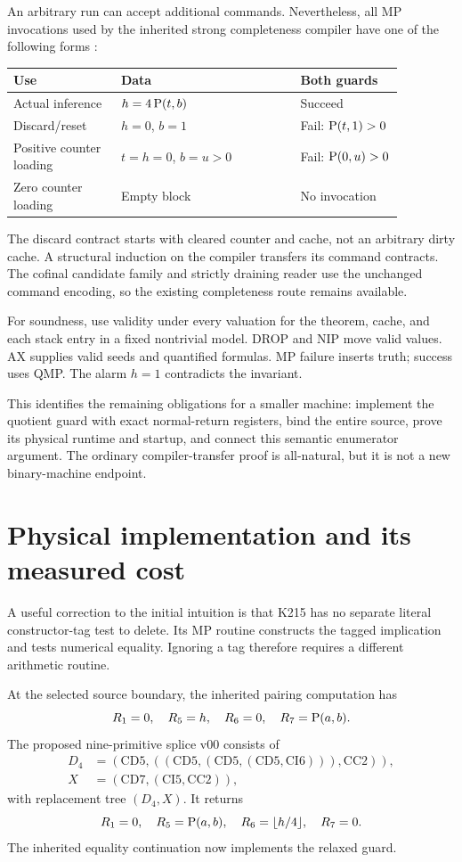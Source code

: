 \documentclass[11pt]{article}
\begin{document}
An arbitrary run can accept additional commands. Nevertheless, all MP invocations used by the inherited strong completeness compiler have one of the following forms \cite{enumperm}:
\begin{center}\begin{tabular}{p{0.24\linewidth}p{0.40\linewidth}p{0.23\linewidth}}\toprule
Use & Data & Both guards \\\midrule
Actual inference & $h=4\operatorname{P}(t,b)$ & Succeed \\
Discard/reset & $h=0$, $b=1$ & Fail: $\operatorname{P}(t,1)>0$ \\
Positive counter loading & $t=h=0$, $b=u>0$ & Fail: $\operatorname{P}(0,u)>0$ \\
Zero counter loading & Empty block & No invocation \\\bottomrule
\end{tabular}\end{center}
The discard contract starts with cleared counter and cache, not an arbitrary dirty cache. A structural induction on the compiler transfers its command contracts. The cofinal candidate family and strictly draining reader use the unchanged command encoding, so the existing completeness route remains available.

For soundness, use validity under every valuation for the theorem, cache, and each stack entry in a fixed nontrivial model. DROP and NIP move valid values. AX supplies valid seeds and quantified formulas. MP failure inserts truth; success uses QMP. The alarm $h=1$ contradicts the invariant.

This identifies the remaining obligations for a smaller machine: implement the quotient guard with exact normal-return registers, bind the entire source, prove its physical runtime and startup, and connect this semantic enumerator argument. The ordinary compiler-transfer proof is all-natural, but it is not a new binary-machine endpoint.

\section{Physical implementation and its measured cost}

A useful correction to the initial intuition is that K215 has no separate literal constructor-tag test to delete. Its MP routine constructs the tagged implication and tests numerical equality. Ignoring a tag therefore requires a different arithmetic routine.

At the selected source boundary, the inherited pairing computation has
\[
 R_1=0,\quad R_5=h,\quad R_6=0,\quad R_7=\operatorname{P}(a,b).
\]
The proposed nine-primitive splice v00 consists of
\begin{align*}
 D_4&=(\mathrm{CD5},((\mathrm{CD5},(\mathrm{CD5},(\mathrm{CD5},\mathrm{CI6}))),\mathrm{CC2})),\\
 X&=(\mathrm{CD7},(\mathrm{CI5},\mathrm{CC2})),
\end{align*}
with replacement tree $(D_4,X)$. It returns
\[
 R_1=0,\quad R_5=\operatorname{P}(a,b),\quad R_6=\lfloor h/4\rfloor,\quad R_7=0.
\]
The inherited equality continuation now implements the relaxed guard.
\end{document}
